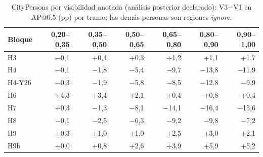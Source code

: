\begin{table}[H]\centering\scriptsize
\caption{CityPersons por visibilidad anotada (análisis posterior declarado): V3$-$V1 en AP@0.5 (pp) por tramo; las demás personas son regiones \emph{ignore}.}\label{tab:s-vis}
\setlength{\tabcolsep}{2.5pt}\begin{tabular}{@{}l rrrrrr@{}}\toprule
Bloque & 0{,}20--0{,}35 & 0{,}35--0{,}50 & 0{,}50--0{,}65 & 0{,}65--0{,}80 & 0{,}80--0{,}90 & 0{,}90--1{,}00 \\ \midrule
H3 & $-$0{,}1 & +0{,}4 & +0{,}3 & +1{,}2 & +1{,}1 & +1{,}7 \\
H4 & $-$0{,}1 & $-$1{,}8 & $-$5{,}4 & $-$9{,}7 & $-$13{,}8 & $-$11{,}9 \\
H4-Y26 & $-$0{,}3 & $-$1{,}9 & $-$5{,}8 & $-$8{,}5 & $-$12{,}8 & $-$9{,}9 \\
H6 & +4{,}3 & +3{,}4 & +2{,}1 & +0{,}4 & +0{,}8 & +0{,}4 \\
H7 & +0{,}3 & $-$1{,}3 & $-$8{,}1 & $-$14{,}1 & $-$16{,}4 & $-$15{,}6 \\
H8 & $-$0{,}1 & $-$2{,}5 & $-$6{,}3 & $-$9{,}2 & $-$9{,}8 & $-$7{,}2 \\
H9 & +0{,}3 & +1{,}0 & +1{,}0 & +2{,}5 & +3{,}0 & +2{,}1 \\
H9b & +0{,}0 & +0{,}8 & +2{,}6 & +3{,}9 & +5{,}9 & +5{,}2 \\
\bottomrule\end{tabular}\end{table}

